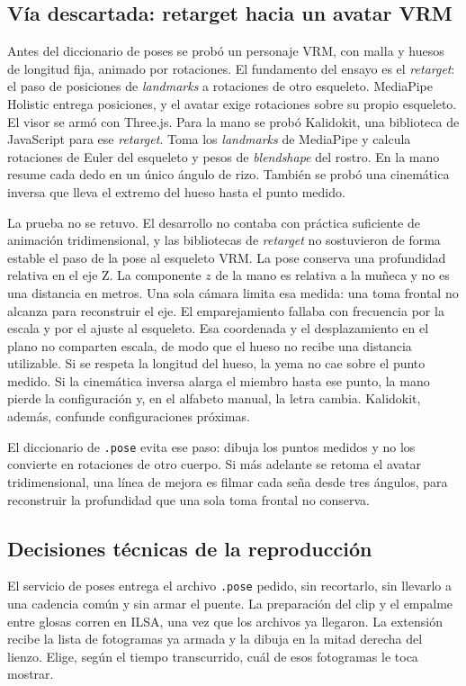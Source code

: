 \subsection{Vía descartada: retarget hacia un avatar VRM}
Antes del diccionario de poses se probó un personaje VRM, con malla y huesos de longitud fija, animado por rotaciones. El fundamento del ensayo es el \textit{retarget}: el paso de posiciones de \textit{landmarks} a rotaciones de otro esqueleto. MediaPipe Holistic entrega posiciones, y el avatar exige rotaciones sobre su propio esqueleto. El visor se armó con Three.js. Para la mano se probó Kalidokit, una biblioteca de JavaScript para ese \textit{retarget}. Toma los \textit{landmarks} de MediaPipe y calcula rotaciones de Euler del esqueleto y pesos de \textit{blendshape} del rostro. En la mano resume cada dedo en un único ángulo de rizo. También se probó una cinemática inversa que lleva el extremo del hueso hasta el punto medido.

La prueba no se retuvo. El desarrollo no contaba con práctica suficiente de animación tridimensional, y las bibliotecas de \textit{retarget} no sostuvieron de forma estable el paso de la pose al esqueleto VRM. La pose conserva una profundidad relativa en el eje Z. La componente $z$ de la mano es relativa a la muñeca y no es una distancia en metros. Una sola cámara limita esa medida: una toma frontal no alcanza para reconstruir el eje. El emparejamiento fallaba con frecuencia por la escala y por el ajuste al esqueleto. Esa coordenada y el desplazamiento en el plano no comparten escala, de modo que el hueso no recibe una distancia utilizable. Si se respeta la longitud del hueso, la yema no cae sobre el punto medido. Si la cinemática inversa alarga el miembro hasta ese punto, la mano pierde la configuración y, en el alfabeto manual, la letra cambia. Kalidokit, además, confunde configuraciones próximas.

El diccionario de \texttt{.pose} evita ese paso: dibuja los puntos medidos y no los convierte en rotaciones de otro cuerpo. Si más adelante se retoma el avatar tridimensional, una línea de mejora es filmar cada seña desde tres ángulos, para reconstruir la profundidad que una sola toma frontal no conserva.

\subsection{Decisiones técnicas de la reproducción}
\label{sec:impl_esqueleto}

El servicio de poses entrega el archivo \texttt{.pose} pedido, sin recortarlo, sin llevarlo a una cadencia común y sin armar el puente. La preparación del clip y el empalme entre glosas corren en ILSA, una vez que los archivos ya llegaron. La extensión recibe la lista de fotogramas ya armada y la dibuja en la mitad derecha del lienzo. Elige, según el tiempo transcurrido, cuál de esos fotogramas le toca mostrar.

